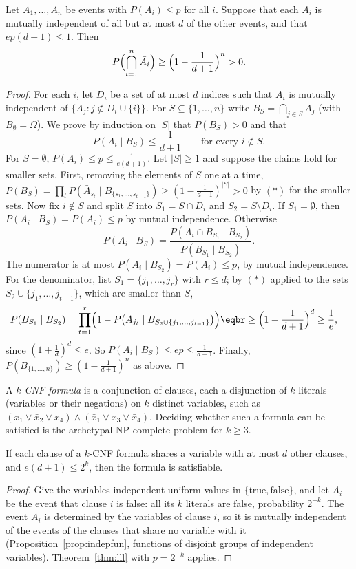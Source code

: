 \begin{theorem}\label{thm:lll}
Let $A_1,\dots,A_n$ be events with $P(A_i)\le p$ for all $i$. Suppose that each $A_i$ is mutually independent of all but at most $d$ of the other
events, and that $ep(d+1)\le1$. Then
\[
P\Bigl(\bigcap_{i=1}^n\bar A_i\Bigr)\ge\Bigl(1-\frac1{d+1}\Bigr)^n>0.
\]
\end{theorem}
\begin{proof}
For each $i$, let $D_i$ be a set of at most $d$ indices such that $A_i$ is mutually independent of $\{A_j:j\notin D_i\cup\{i\}\}$. For $S\subseteq\{1,\dots,n\}$ write
$B_S=\bigcap_{j\in S}\bar A_j$ (with $B_\emptyset=\Omega$). We prove by induction on $|S|$ that $P(B_S)>0$ and that
\[
P(A_i\mid B_S)\le\frac1{d+1}\qquad\text{for every }i\notin S.\tag{$*$}
\]
For $S=\emptyset$, $P(A_i)\le p\le\frac1{e(d+1)}$. Let $|S|\ge1$ and suppose the claims hold for smaller sets. First, removing the elements of $S$ one at a
time, $P(B_S)=\prod_tP(\bar A_{s_t}\mid B_{\{s_1,\dots,s_{t-1}\}})\ge(1-\frac1{d+1})^{|S|}>0$ by $(*)$ for the smaller sets. Now fix $i\notin S$ and split $S$ into $S_1=S\cap D_i$ and $S_2=S\setminus D_i$.
If $S_1=\emptyset$, then $P(A_i\mid B_S)=P(A_i)\le p$ by mutual independence. Otherwise
\[
P(A_i\mid B_S)=\frac{P(A_i\cap B_{S_1}\mid B_{S_2})}{P(B_{S_1}\mid B_{S_2})}.
\]
The numerator is at most $P(A_i\mid B_{S_2})=P(A_i)\le p$, by mutual independence. For the denominator, list $S_1=\{j_1,\dots,j_r\}$ with $r\le d$; by $(*)$ applied to the
sets $S_2\cup\{j_1,\dots,j_{t-1}\}$, which are smaller than $S$,
\[
\begin{aligned}P(B_{S_1}\mid B_{S_2})&=\prod_{t=1}^r\Bigl(1-P\bigl(A_{j_t}\mid B_{S_2\cup\{j_1,\dots,j_{t-1}\}}\bigr)\Bigr)\eqbr\ge\Bigl(1-\frac1{d+1}\Bigr)^d\ge\frac1e,\end{aligned}
\]
since $(1+\frac1d)^d\le e$. So $P(A_i\mid B_S)\le ep\le\frac1{d+1}$. Finally, $P(B_{\{1,\dots,n\}})\ge(1-\frac1{d+1})^n$ as above.
\end{proof}

A \emph{$k$-CNF formula} is a conjunction of clauses, each a disjunction of $k$ literals (variables or their negations) on $k$ distinct
variables, such as $(x_1\vee\bar x_2\vee x_4)\wedge(\bar x_1\vee x_3\vee\bar x_4)$. Deciding whether such a formula can be satisfied is the archetypal NP-complete problem for
$k\ge3$.

\begin{corollary}\label{cor:ksat}
If each clause of a $k$-CNF formula shares a variable with at most $d$ other clauses, and $e(d+1)\le2^k$, then the formula is satisfiable.
\end{corollary}
\begin{proof}
Give the variables independent uniform values in $\{\text{true},\text{false}\}$, and let $A_i$ be the event that clause $i$ is false: all its $k$ literals are false,
probability $2^{-k}$. The event $A_i$ is determined by the variables of clause $i$, so it is mutually independent of the events of the clauses
that share no variable with it (Proposition~\ref{prop:indepfun}, functions of disjoint groups of independent variables). Theorem~\ref{thm:lll} with $p=2^{-k}$ applies.
\end{proof}

